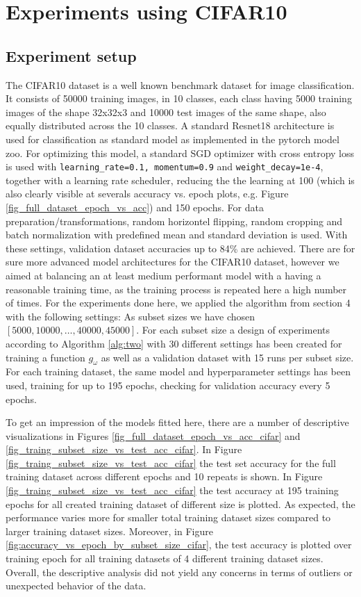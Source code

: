 \documentclass{article} %
\begin{document}
\section{Experiments using CIFAR10}

\subsection{Experiment setup}


The CIFAR10 dataset \cite{Cifar10} is a well known benchmark dataset for image classification.
It consists of 50000 training images, in 10 classes, each class having 5000 training images of the shape 32x32x3 and 10000 test images of the same shape, also equally distributed across the 10 classes.
A standard Resnet18 architecture \cite{he2015resnet} is used for classification as standard model as implemented in the pytorch \cite{pytorch} model zoo.
For optimizing this model, a standard SGD optimizer with cross entropy loss is used with \verb|learning_rate=0.1, momentum=0.9| and \verb|weight_decay=1e-4|, together with a learning rate scheduler, reducing the the learning at 100 (which is also clearly visible at severals accuracy vs. epoch plots, e.g. Figure \ref{fig_full_dataset_epoch_vs_acc}) and 150 epochs.
For data preparation/transformations, random horizontel flipping, random cropping and batch normalization with predefined mean and standard deviation is used.
With these settings, validation dataset accuracies up to 84\% are achieved.
There are for sure more advanced model architectures for the CIFAR10 dataset, however we aimed at balancing an at least medium performant model with a having a reasonable training time, as the training process is repeated here a high number of times.
For the experiments done here, we applied the algorithm from section 4 with the following settings:
As subset sizes we have chosen $[5000, 10000, \dots, 40000, 45000]$. For each subset size a design of experiments according to Algorithm \ref{alg:two} with 30 different settings has been created for training a function $g_{\omega}$ as well as a validation dataset with 15 runs per subset size.
For each training dataset, the same model and hyperparameter settings has been used, training for up to 195 epochs, checking for validation accuracy every 5 epochs.


To get an impression of the models fitted here, there are a number of descriptive visualizations in Figures \ref{fig_full_dataset_epoch_vs_acc_cifar} and \ref{fig_traing_subset_size_vs_test_acc_cifar}. In Figure \ref{fig_traing_subset_size_vs_test_acc_cifar} the test set accuracy for the full training dataset across different epochs and 10 repeats is shown.
In Figure \ref{fig_traing_subset_size_vs_test_acc_cifar} the test accuracy at 195 training epochs for all created training dataset of different size is plotted. As expected, the performance varies more for smaller total training dataset sizes compared to larger training dataset sizes.
Moreover, in Figure \ref{fig:accuracy_vs_epoch_by_subset_size_cifar}, the test accuracy is plotted over training epoch for all training datasets of 4 different training dataset sizes.
Overall, the descriptive analysis did not yield any concerns in terms of outliers or unexpected behavior of the data.
\end{document}
